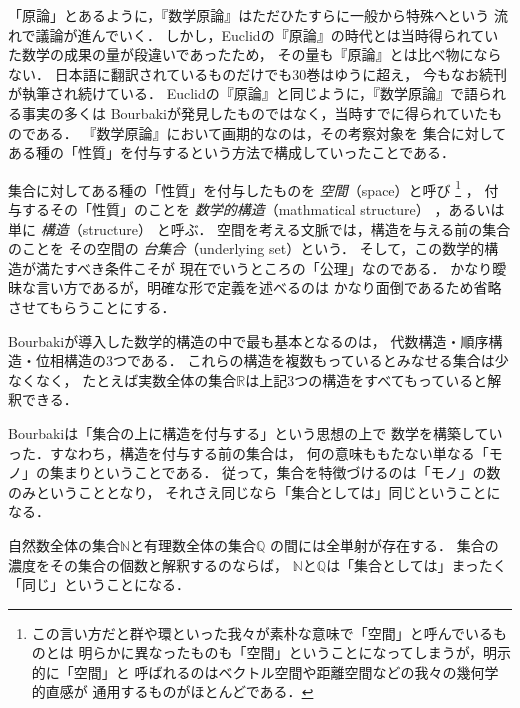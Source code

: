  「原論」とあるように，『数学原論』はただひたすらに一般から特殊へという
  流れで議論が進んでいく．
  しかし，Euclidの『原論』の時代とは当時得られていた数学の成果の量が段違いであったため，
  その量も『原論』とは比べ物にならない．
  日本語に翻訳されているものだけでも30巻はゆうに超え，
  今もなお続刊が執筆され続けている．
  Euclidの『原論』と同じように，『数学原論』で語られる事実の多くは
  Bourbakiが発見したものではなく，当時すでに得られていたものである．
  『数学原論』において画期的なのは，その考察対象を
  集合に対してある種の「性質」を付与するという方法で構成していったことである．

  集合に対してある種の「性質」を付与したものを
  \emph{空間}（space）と呼び
  \footnote{この言い方だと群や環といった我々が素朴な意味で「空間」と呼んでいるものとは
    明らかに異なったものも「空間」ということになってしまうが，明示的に「空間」と
    呼ばれるのはベクトル空間や距離空間などの我々の幾何学的直感が
    通用するものがほとんどである．}
  ，
  付与するその「性質」のことを
  \emph{数学的構造}（mathmatical structure）
  ，あるいは単に %
  \emph{構造}（structure）
  と呼ぶ．
  空間を考える文脈では，構造を与える前の集合のことを
  その空間の
  \emph{台集合}（underlying set）という．
  そして，この数学的構造が満たすべき条件こそが
  現在でいうところの「公理」なのである．
  かなり曖昧な言い方であるが，明確な形で定義を述べるのは
  かなり面倒であるため省略させてもらうことにする．

  Bourbakiが導入した数学的構造の中で最も基本となるのは，
  代数構造・順序構造・位相構造の3つである．
  これらの構造を複数もっているとみなせる集合は少なくなく，
  たとえば実数全体の集合$\mathbb{R}$は上記3つの構造をすべてもっていると解釈できる．
  
  Bourbakiは「集合の上に構造を付与する」という思想の上で
  数学を構築していった．すなわち，構造を付与する前の集合は，
  何の意味ももたない単なる「モノ」の集まりということである．
  従って，集合を特徴づけるのは「モノ」の数のみということとなり，
  それさえ同じなら「集合としては」同じということになる．

  \begin{ex} \label{ex:setisomorphic}
    自然数全体の集合$\mathbb{N}$と有理数全体の集合$\mathbb{Q}$
    の間には全単射が存在する．
    集合の濃度をその集合の個数と解釈するのならば，
    $\mathbb{N}$と$\mathbb{Q}$は「集合としては」まったく「同じ」ということになる．
  \end{ex}

